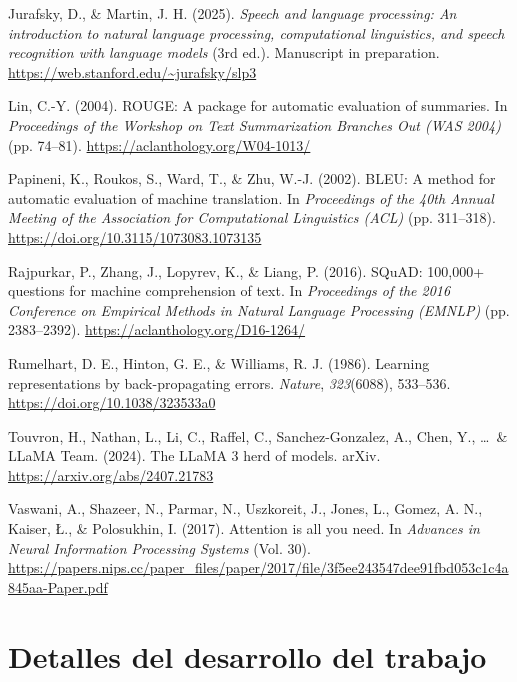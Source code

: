 \documentclass[12pt,twoside]{article}
\begin{document}
\begin{thebibliography}{100}
 Jurafsky, D., \& Martin, J. H. (2025). \textit{Speech and language processing: An introduction to natural language processing, computational linguistics, and speech recognition with language models} (3rd ed.). Manuscript in preparation. \url{https://web.stanford.edu/~jurafsky/slp3}

 Lin, C.-Y. (2004). ROUGE: A package for automatic evaluation of summaries. In \textit{Proceedings of the Workshop on Text Summarization Branches Out (WAS 2004)} (pp. 74--81). \url{https://aclanthology.org/W04-1013/}

 Papineni, K., Roukos, S., Ward, T., \& Zhu, W.-J. (2002). BLEU: A method for automatic evaluation of machine translation. In \textit{Proceedings of the 40th Annual Meeting of the Association for Computational Linguistics (ACL)} (pp. 311--318). \url{https://doi.org/10.3115/1073083.1073135}

 Rajpurkar, P., Zhang, J., Lopyrev, K., \& Liang, P. (2016). SQuAD: 100,000+ questions for machine comprehension of text. In \textit{Proceedings of the 2016 Conference on Empirical Methods in Natural Language Processing (EMNLP)} (pp. 2383--2392). \url{https://aclanthology.org/D16-1264/}

 Rumelhart, D. E., Hinton, G. E., \& Williams, R. J. (1986). Learning representations by back-propagating errors. \textit{Nature}, \textit{323}(6088), 533--536. \url{https://doi.org/10.1038/323533a0}

 Touvron, H., Nathan, L., Li, C., Raffel, C., Sanchez-Gonzalez, A., Chen, Y., \ldots\ \& LLaMA Team. (2024). The LLaMA 3 herd of models. arXiv. \url{https://arxiv.org/abs/2407.21783}

 Vaswani, A., Shazeer, N., Parmar, N., Uszkoreit, J., Jones, L., Gomez, A. N., Kaiser, Ł., \& Polosukhin, I. (2017). Attention is all you need. In \textit{Advances in Neural Information Processing Systems} (Vol. 30). \url{https://papers.nips.cc/paper_files/paper/2017/file/3f5ee243547dee91fbd053c1c4a845aa-Paper.pdf}





\end{thebibliography}


\newpage
\appendix

\section{Detalles del desarrollo del trabajo}
\end{document}
